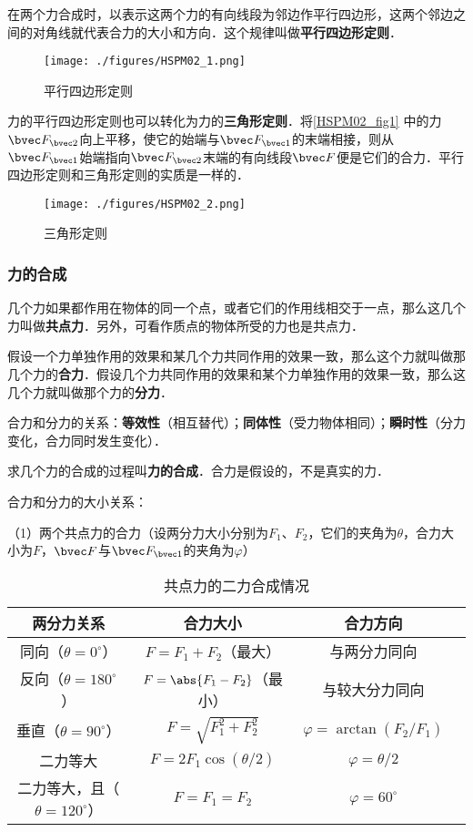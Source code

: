 在两个力合成时，以表示这两个力的有向线段为邻边作平行四边形，这两个邻边之间的对角线就代表合力的大小和方向．这个规律叫做\textbf{平行四边形定则}．
\begin{figure}[ht]
\centering
\texttt{[image: ./figures/HSPM02\_1.png]}
\caption{平行四边形定则} \label{HSPM02_fig1}
\end{figure}

力的平行四边形定则也可以转化为力的\textbf{三角形定则}．将\autoref{HSPM02_fig1} 中的力$\bvec F_{\bvec 2}$向上平移，使它的始端与$\bvec F_{\bvec 1}$的末端相接，则从$\bvec F_{\bvec 1}$始端指向$\bvec F_{\bvec 2}$末端的有向线段$\bvec F$便是它们的合力．平行四边形定则和三角形定则的实质是一样的．
\begin{figure}[ht]
\centering
\texttt{[image: ./figures/HSPM02\_2.png]}
\caption{三角形定则} \label{HSPM02_fig2}
\end{figure}

\subsubsection{力的合成}
几个力如果都作用在物体的同一个点，或者它们的作用线相交于一点，那么这几个力叫做\textbf{共点力}．另外，可看作质点的物体所受的力也是共点力．

假设一个力单独作用的效果和某几个力共同作用的效果一致，那么这个力就叫做那几个力的\textbf{合力}．假设几个力共同作用的效果和某个力单独作用的效果一致，那么这几个力就叫做那个力的\textbf{分力}．

合力和分力的关系：\textbf{等效性}（相互替代）；\textbf{同体性}（受力物体相同）；\textbf{瞬时性}（分力变化，合力同时发生变化）．

求几个力的合成的过程叫\textbf{力的合成}．合力是假设的，不是真实的力．

合力和分力的大小关系：

（1）两个共点力的合力（设两分力大小分别为$F_1$、$F_2$，它们的夹角为$\theta$，合力大小为$F$，$\bvec F$与$\bvec F_{\bvec 1}$的夹角为$\varphi $）

\begin{table}[ht]
\centering
\caption{共点力的二力合成情况}\label{HSPM02_tab1}
\begin{tabular}{|c|c|c|c|}
\hline
两分力关系 &  合力大小 & 合力方向 \\
\hline
同向（$\theta=0^{\circ}$） &  $F=F_1+F_2$（最大） & 与两分力同向 \\
\hline
反向（$\theta=180^{\circ}$） &  $F=\abs{F_1-F_2}$（最小） & 与较大分力同向 \\
\hline
垂直（$\theta=90^{\circ}$） &  $F=\sqrt{F_1^2+F_2^2}$ & $\varphi=\arctan{(F_2/F_1)}$ \\
\hline
二力等大 &  $F=2F_1\cos{(\theta/2)}$ & $\varphi=\theta/2$ \\
\hline
二力等大，且（$\theta=120^{\circ}$） &  $F=F_1=F_2$ & $\varphi=60^{\circ}$ \\
\hline
\end{tabular}
\end{table}

